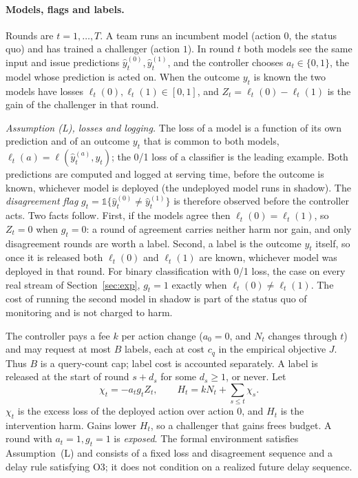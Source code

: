 \documentclass[10pt]{article}
\theoremstyle{plain}
\theoremstyle{definition}
\newcommand{\one}{\mathds{1}}
\begin{document}
\paragraph{Models, flags and labels.}
Rounds are $t=1,\dots,T$. A team runs an incumbent model (action $0$, the status quo) and has trained a challenger (action $1$). In round $t$ both models see the same input and issue predictions $\hat y^{(0)}_t,\hat y^{(1)}_t$, and the controller chooses $a_t\in\{0,1\}$, the model whose prediction is acted on. When the outcome $y_t$ is known the two models have losses $\ell_t(0),\ell_t(1)\in[0,1]$, and $Z_t=\ell_t(0)-\ell_t(1)$ is the gain of the challenger in that round.

\emph{Assumption (L), losses and logging.} The loss of a model is a function of its own prediction and of an outcome $y_t$ that is common to both models, $\ell_t(a)=\ell(\hat y^{(a)}_t,y_t)$; the 0/1 loss of a classifier is the leading example. Both predictions are computed and logged at serving time, before the outcome is known, whichever model is deployed (the undeployed model runs in shadow). The \emph{disagreement flag} $g_t=\one\{\hat y^{(0)}_t\ne\hat y^{(1)}_t\}$ is therefore observed before the controller acts. Two facts follow. First, if the models agree then $\ell_t(0)=\ell_t(1)$, so $Z_t=0$ when $g_t=0$: a round of agreement carries neither harm nor gain, and only disagreement rounds are worth a label. Second, a label is the outcome $y_t$ itself, so once it is released both $\ell_t(0)$ and $\ell_t(1)$ are known, whichever model was deployed in that round. For binary classification with 0/1 loss, the case on every real stream of Section~\ref{sec:exp}, $g_t=1$ exactly when $\ell_t(0)\ne\ell_t(1)$. The cost of running the second model in shadow is part of the status quo of monitoring and is not charged to harm.

The controller pays a fee $k$ per action change ($a_0=0$, and $N_t$ changes through $t$) and may request at most $B$ labels, each at cost $c_q$ in the empirical objective $J$. Thus $B$ is a query-count cap; label cost is accounted separately. A label is released at the start of round $s+d_s$ for some $d_s\ge1$, or never. Let
\begin{equation*}
\chi_t=-a_tg_tZ_t,\qquad H_t=kN_t+\sum_{s\le t}\chi_s .
\end{equation*}
$\chi_t$ is the excess loss of the deployed action over action $0$, and $H_t$ is the intervention harm. Gains lower $H_t$, so a challenger that gains frees budget. A round with $a_t=1,g_t=1$ is \emph{exposed}. The formal environment satisfies Assumption~(L) and consists of a fixed loss and disagreement sequence and a delay rule satisfying O3; it does not condition on a realized future delay sequence.
\end{document}
